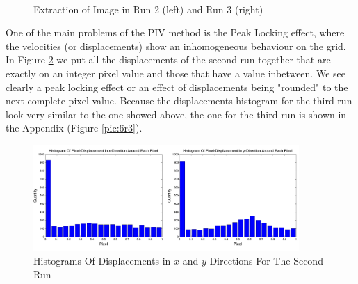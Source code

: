 \begin{figure}[H]
\centering
\mbox{
\quad
{}}
\caption{Extraction of Image in Run 2 (left) and Run 3 (right)}
\label{pic:compared}
\end{figure}

One of the main problems of the PIV method is the Peak Locking effect, where the velocities (or displacements) show an inhomogeneous behaviour on the grid. In Figure \ref{pic:6r2} we put all the displacements of the second run together that are exactly on an integer pixel value and those that have a value inbetween. We see clearly a peak locking effect or an effect of displacements being "rounded" to the next complete pixel value. Because the displacements histogram for the third run look very similar to the one showed above, the one for the third run is shown in the Appendix (Figure \ref{pic:6r3}). 

\begin{figure}[H]
\centering
\includegraphics[width=0.9\textwidth]{pics/figure6_run2.png}
\caption{Histograms Of Displacements in $x$ and $y$ Directions For The Second Run}
\label{pic:6r2}
\end{figure}